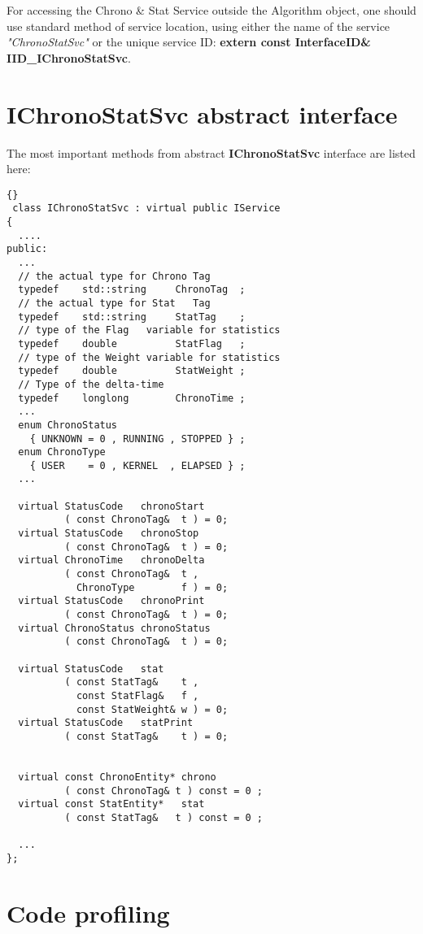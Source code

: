 \documentclass{lhcbnote}
\newcommand{\bftt}         {\ttfamily\bfseries}
\renewcommand{\it}         {\itshape}
\begin{document}
For accessing the Chrono \& Stat Service outside the Algorithm
object, one should use standard method of service location, using
either the name of the service {\it "ChronoStatSvc"} or the unique
service ID: {\bftt{ extern const InterfaceID\& IID\_IChronoStatSvc}}.

\section{{\bftt{IChronoStatSvc}} abstract interface}

The most important methods from abstract
{\bftt{IChronoStatSvc}} interface are listed here:

\begin{lstlisting}{}
 class IChronoStatSvc : virtual public IService
{
  ....
public:
  ...
  // the actual type for Chrono Tag
  typedef    std::string     ChronoTag  ;
  // the actual type for Stat   Tag
  typedef    std::string     StatTag    ;
  // type of the Flag   variable for statistics
  typedef    double          StatFlag   ;
  // type of the Weight variable for statistics
  typedef    double          StatWeight ;
  // Type of the delta-time
  typedef    longlong        ChronoTime ;
  ...
  enum ChronoStatus
    { UNKNOWN = 0 , RUNNING , STOPPED } ;
  enum ChronoType
    { USER    = 0 , KERNEL  , ELAPSED } ;
  ...

  virtual StatusCode   chronoStart
          ( const ChronoTag&  t ) = 0;
  virtual StatusCode   chronoStop
          ( const ChronoTag&  t ) = 0;
  virtual ChronoTime   chronoDelta
          ( const ChronoTag&  t ,
            ChronoType        f ) = 0;
  virtual StatusCode   chronoPrint
          ( const ChronoTag&  t ) = 0;
  virtual ChronoStatus chronoStatus
          ( const ChronoTag&  t ) = 0;

  virtual StatusCode   stat
          ( const StatTag&    t ,
            const StatFlag&   f ,
            const StatWeight& w ) = 0;
  virtual StatusCode   statPrint
          ( const StatTag&    t ) = 0;


  virtual const ChronoEntity* chrono
          ( const ChronoTag& t ) const = 0 ;
  virtual const StatEntity*   stat
          ( const StatTag&   t ) const = 0 ;

  ...
};
\end{lstlisting}

\section{Code profiling}
\end{document}
